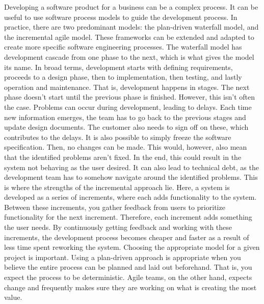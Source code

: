 
Developing a software product for a business can be a complex process.
It can be useful to use software process models to guide the development process.
In practice, there are two predominant models: the plan-driven waterfall model, and the incremental agile model.
These frameworks can be extended and adapted to create more specific software engineering processes.
The waterfall model has development cascade from one phase to the next, which is what gives the model its name.
In broad terms, development starts with defining requirements, proceeds to a design phase, then to implementation, then testing, and lastly operation and maintenance.
That is, development happens in stages. The next phase doesn't start until the previous phase is finished.
However, this isn't often the case. Problems can occur during development, leading to delays. Each time new information emerges, the team has to go back to the previous stages and update design documents. The customer also needs to sign off on these, which contributes to the delays.
It is also possible to simply freeze the software specification. Then, no changes can be made. This would, however, also mean that the identified problems aren't fixed. In the end, this could result in the system not behaving as the user desired. It can also lead to technical debt, as the development team has to somehow navigate around the identified problems.
This is where the strengths of the incremental approach lie. Here, a system is developed as a series of increments, where each adds functionality to the system. Between these increments, you gather feedback from users to prioritize functionality for the next increment. Therefore, each increment adds something the user needs.
By continuously getting feedback and working with these increments, the development process becomes cheaper and faster as a result of less time spent reworking the system.\cite{sommervilleSoftwareEngineering2016}
Choosing the appropriate model for a given project is important.
Using a plan-driven approach is appropriate when you believe the entire process can be planned and laid out beforehand. That is, you expect the process to be deterministic.
Agile teams, on the other hand, expects change and frequently makes sure they are working on what is creating the most value.

